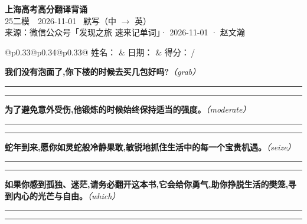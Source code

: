\documentclass[11pt,a4paper]{article}
\newcommand{\num}[1]{\makebox[1.9em][r]{#1.}\hspace{0.3em}}
\newcommand{\wline}{\noindent\rule{\linewidth}{0.4pt}}
\newcommand{\prompt}[1]{\emph{\textcolor{tipblue}{\small（#1）}}}
\begin{document}
\pagestyle{plain}
\begin{center}
{\LARGE\bfseries 上海高考高分翻译背诵 }\\[0.25em]
{\large 25二模　2026-11-01 \quad\ 默写（中 $\to$ 英）}\\[0.35em]
{\footnotesize 来源：微信公众号「发现之旅 速来记单词」· 2026-11-01 · 赵文瀚}
\end{center}

\vspace{0.4em}
\noindent\begin{tabular}{@{}p{0.33\textwidth}@{}p{0.34\textwidth}@{}p{0.33\textwidth}@{}}
姓名：\underline{\hspace{2.0cm}} & 日期：\underline{\hspace{2.0cm}} & 得分：\underline{\hspace{1.4cm}}\,/ \\
\end{tabular}

\vspace{0.5em}

\vspace{0.8em}
\num{1}\textbf{我们没有泡面了,你下楼的时候去买几包好吗?}\prompt{grab}

\vspace{0.3em}

\wline\vspace{0.3em}
\wline

\num{2}\textbf{为了避免意外受伤,他锻炼的时候始终保持适当的强度。}\prompt{moderate}

\vspace{0.3em}

\wline\vspace{0.3em}
\wline

\num{3}\textbf{蛇年到来,愿你如灵蛇般冷静果敢,敏锐地抓住生活中的每一个宝贵机遇。}\prompt{seize}

\vspace{0.3em}

\wline\vspace{0.3em}
\wline

\num{4}\textbf{如果你感到孤独、迷茫,请务必翻开这本书,它会给你勇气,助你挣脱生活的樊笼,寻到内心的光芒与自由。}\prompt{which}

\vspace{0.3em}

\wline\vspace{0.3em}
\wline
\end{document}
